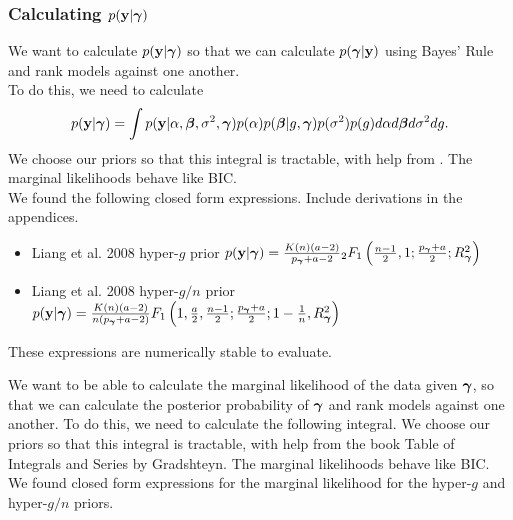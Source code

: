 \documentclass{amsart}[12pt]
\begin{document}
\subsubsection{Calculating $p({\bf y} | {\boldsymbol \gamma})$}
We want to calculate $p({\bf y} | {\boldsymbol \gamma})$ so that we can calculate $p({\boldsymbol \gamma} | {\bf y})$ using Bayes' Rule and rank models against	one another. \\
To do this, we need to calculate
$$p({\bf y} | {\boldsymbol \gamma}) = \int p({\bf y} | \alpha, {\boldsymbol \beta}, \sigma^2, {\boldsymbol \gamma}) p(\alpha) p({\boldsymbol \beta} | g, {\boldsymbol \gamma}) p(\sigma^2) p(g) d \alpha d {\boldsymbol \beta} d \sigma^2 d g.$$
We choose our priors so that this integral is tractable, with help from \cite{Gradshteyn1988}.
The marginal likelihoods behave like BIC. \\
We found the following closed form expressions.
Include derivations in the appendices.
\small
\begin{itemize}
	\item Liang et al. 2008 hyper-$g$ prior \cite{Liang2008}
		$p({\bf y} | {\boldsymbol \gamma}) = \frac{K(n) (a - 2)}{p_{\boldsymbol \gamma} + a  - 2} {}_2 F_1 \left( \frac{n-1}{2}, 1; \frac{p_{\boldsymbol \gamma} + a}{2}; R_{\boldsymbol \gamma}^2 \right)$
	\item Liang et al. 2008 hyper-$g/n$ prior \cite{Liang2008}
		$p({\bf y} | {\boldsymbol \gamma}) = \frac{K(n) (a - 2)}{n (p_{\boldsymbol \gamma} + a  - 2)} F_1 \left( 1, \frac{a}{2}, \frac{n-1}{2}; \frac{p_{\boldsymbol \gamma} + a}{2}; 1 - \frac{1}{n}, R_{\boldsymbol \gamma}^2 \right)$
\end{itemize}
These expressions are numerically stable to evaluate.

We want to be able to calculate the marginal likelihood of the data given ${\boldsymbol \gamma}$, so that we can
calculate the posterior probability of ${\boldsymbol \gamma}$ and rank models against one another. To do this, we
need to calculate the following integral.
We choose our priors so that this integral is tractable, with help from the book Table of Integrals and
Series by Gradshteyn. The marginal likelihoods behave like BIC.
We found closed form expressions for the marginal likelihood for the hyper-$g$ and hyper-$g/n$ priors.
\end{document}
